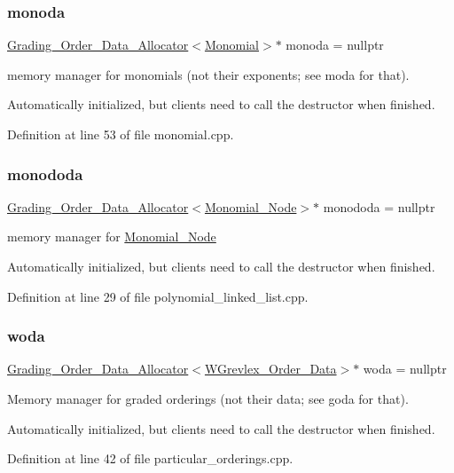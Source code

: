 \subsubsection{\texorpdfstring{monoda}{monoda}}
{\footnotesize\ttfamily \hyperlink{group__memorygroup_class_grading___order___data___allocator}{Grading\+\_\+\+Order\+\_\+\+Data\+\_\+\+Allocator}$<$\hyperlink{group__polygroup_class_monomial}{Monomial}$>$$\ast$ monoda = nullptr}



memory manager for monomials (not their exponents; see moda for that). 

Automatically initialized, but clients need to call the destructor when finished. 

Definition at line 53 of file monomial.\+cpp.

\mbox{\label{group__memorygroup_ga2b5eeb775f6c601e624b487f3245983a}} 
\subsubsection{\texorpdfstring{monododa}{monododa}}
{\footnotesize\ttfamily \hyperlink{group__memorygroup_class_grading___order___data___allocator}{Grading\+\_\+\+Order\+\_\+\+Data\+\_\+\+Allocator}$<$\hyperlink{group__polygroup_class_monomial___node}{Monomial\+\_\+\+Node}$>$$\ast$ monododa = nullptr}



memory manager for \hyperlink{group__polygroup_class_monomial___node}{Monomial\+\_\+\+Node} 

Automatically initialized, but clients need to call the destructor when finished. 

Definition at line 29 of file polynomial\+\_\+linked\+\_\+list.\+cpp.

\mbox{\label{group__memorygroup_ga929e61b883d430fc6909a80fdb9ebb83}} 
\subsubsection{\texorpdfstring{woda}{woda}}
{\footnotesize\ttfamily \hyperlink{group__memorygroup_class_grading___order___data___allocator}{Grading\+\_\+\+Order\+\_\+\+Data\+\_\+\+Allocator}$<$\hyperlink{group__orderinggroup_class_w_grevlex___order___data}{W\+Grevlex\+\_\+\+Order\+\_\+\+Data}$>$$\ast$ woda = nullptr}



Memory manager for graded orderings (not their data; see goda for that). 

Automatically initialized, but clients need to call the destructor when finished. 

Definition at line 42 of file particular\+\_\+orderings.\+cpp.

